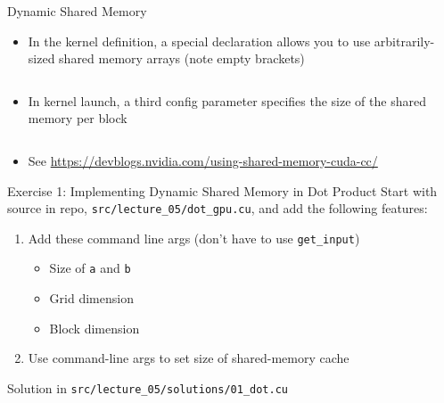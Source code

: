 \documentclass{beamer}
\begin{document}
    \begin{frame}{Dynamic Shared Memory}
        \begin{itemize}
            \item In the kernel definition, a special declaration allows you to use arbitrarily-sized shared memory arrays (note empty brackets)
            \begin{block}{}
                \inputminted{cuda}{src/shared_01.cu}
            \end{block}
            \item In kernel launch, a third config parameter specifies the size of the shared memory per block
            \begin{block}{}
                \inputminted{cuda}{src/shared_02.cu}
            \end{block}
            \item See \url{https://devblogs.nvidia.com/using-shared-memory-cuda-cc/}
        \end{itemize}
    \end{frame}

    \begin{frame}{Exercise 1:  Implementing Dynamic Shared Memory in Dot Product}
        Start with source in repo, \texttt{src/lecture\_05/dot\_gpu.cu}, and add
        the following features:
        \begin{enumerate}
            \item Add these command line args (don't have to use \texttt{get\_input})
            \begin{itemize}
                \item Size of \texttt{a} and \texttt{b}
                \item Grid dimension
                \item Block dimension
            \end{itemize}
            \item Use command-line args to set size of shared-memory cache
        \end{enumerate}
        Solution in \texttt{src/lecture\_05/solutions/01\_dot.cu}
    \end{frame}
\end{document}
